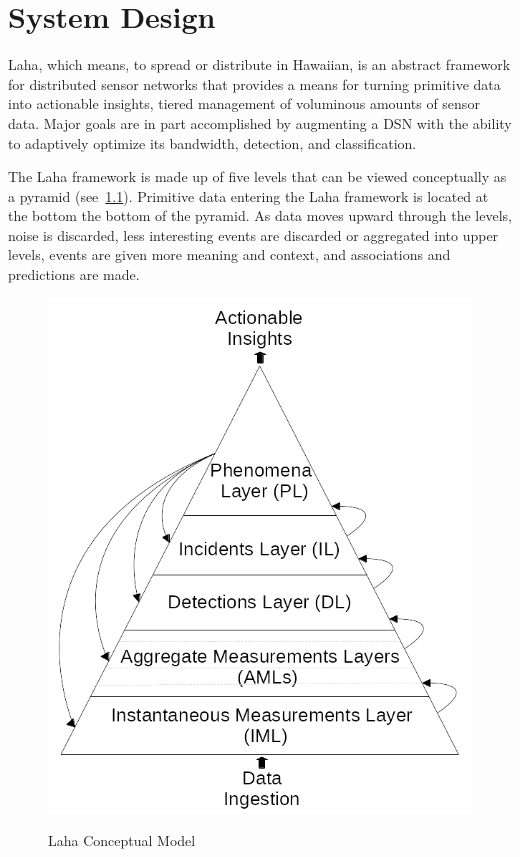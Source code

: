 
\chapter{System Design}\label{ch:system-design}
Laha, which means, to spread or distribute in Hawaiian, is an abstract framework for distributed sensor networks that provides a means for turning primitive data into actionable insights, tiered management of voluminous amounts of sensor data. Major goals are in part accomplished by augmenting a DSN with the ability to adaptively optimize its bandwidth, detection, and classification.

The Laha framework is made up of five levels that can be viewed conceptually as a pyramid (see~\ref{laha-figure}). Primitive data entering the Laha framework is located at the bottom the bottom of the pyramid. As data moves upward through the levels, noise is discarded, less interesting events are discarded or aggregated into upper levels, events are given more meaning and context, and associations and predictions are made.

\begin{figure}
\caption{Laha Conceptual Model}
\centering
\includegraphics{figures/laha.png}
\label{laha-figure}
\end{figure}

